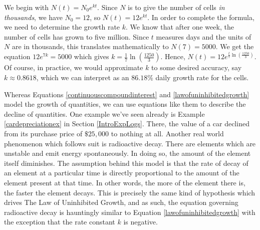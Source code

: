 \medskip

{ We begin with $N(t) = N_{0}e^{kt}$.  Since $N$ is to give the number of cells \textit{in thousands}, we have $N_{0} = 12$, so $N(t) = 12e^{kt}$.  In order to complete the formula, we need to determine the growth rate $k$.  We know that after one week, the number of cells has grown to five million.  Since $t$ measures days and the units of $N$ are in thousands, this translates mathematically to $N(7) = 5000$.  We get the equation $12e^{7k} = 5000$ which gives $k = \frac{1}{7} \ln\left(\frac{1250}{3}\right)$.  Hence,  $N(t) = 12e^{ \frac{t}{7} \ln\left(\frac{1250}{3}\right)}$.  Of course, in practice, we would approximate $k$ to some desired accuracy, say $k \approx 0.8618$, which we can interpret as an $86.18 \%$ daily growth rate for the cells.}

\medskip

Whereas Equations \ref{continuouscompoundinterest} and \ref{lawofuninhibitedgrowth} model the growth of quantities, we can use equations like them to describe the decline of quantities.  One example we've seen already is Example \ref{cardepreciationex} in Section \ref{IntroExpLogs}.  There, the value of a car declined from its purchase price of $\$25,\!000$ to nothing at all.  Another real world phenomenon which follows suit is radioactive decay.  There are elements which are unstable and emit energy spontaneously.  In doing so, the amount of the element itself diminishes.  The assumption behind this model is that the rate of decay of an element at a particular time is directly proportional to the amount of the element present at that time.  In other words, the more of the element there is, the faster the element decays.  This is precisely the same kind of hypothesis which drives The Law of Uninhibited Growth, and as such, the equation governing radioactive decay is hauntingly similar to Equation \ref{lawofuninhibitedgrowth} with the exception that the rate constant $k$ is negative.

\smallskip


